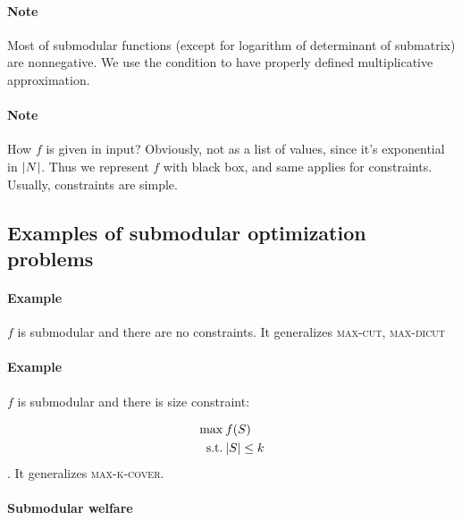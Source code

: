 \paragraph{Note} Most of submodular functions (except for logarithm of determinant of submatrix) are nonnegative. We use the condition to have properly defined multiplicative approximation.
\paragraph{Note} How $f$ is given in input? Obviously, not as a list of values, since it's exponential in $\abs{N}$. Thus we represent $f$ with black box, and same applies for constraints. Usually, constraints are simple. 

\subsection{Examples of submodular optimization problems}
\paragraph{Example}
$f$ is submodular and there are no constraints. It generalizes \textsc{max-cut}, \textsc{max-dicut}
\paragraph{Example}
$f$ is submodular and there is size constraint:

\begin{align}
\max \: & f(S)\\
\text{s.t.} \: & \abs{S} \leq k
\end{align}
. It generalizes \textsc{max-k-cover}.

\paragraph{Submodular welfare}